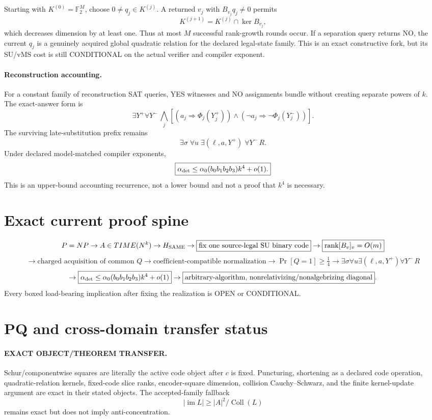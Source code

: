 \documentclass[11pt]{article}
\begin{document}
Starting with \(K^{(0)}=\mathbb F_2^M\), choose \(0\ne q_j\in K^{(j)}\). A returned \(v_j\) with \(B_{v_j}q_j\ne0\) permits
\[
K^{(j+1)}=K^{(j)}\cap\ker B_{v_j},
\]
which decreases dimension by at least one. Thus at most \(M\) successful rank-growth rounds occur. If a separation query returns NO, the current \(q_j\) is a genuinely acquired global quadratic relation for the declared legal-state family. This is an exact constructive fork, but its SU/vMS cost is still CONDITIONAL on the actual verifier and compiler exponent.

\paragraph{Reconstruction accounting.}
For a constant family of reconstruction SAT queries, YES witnesses and NO assignments bundle without creating separate powers of \(k\). The exact-answer form is
\[
\exists Y^+\forall Y^-\,\bigwedge_j
[(a_j\Rightarrow\Phi_j(Y_j^+))\wedge
(\neg a_j\Rightarrow\neg\Phi_j(Y_j^-))].
\]
The surviving late-substitution prefix remains
\[
\boxed{\exists\sigma\;\forall u\;\exists(\ell,a,Y^+)\;\forall Y^-\,R.}
\]
Under declared model-matched compiler exponents,
\[
\boxed{\alpha_{\rm det}\le
\alpha_0(b_0b_1b_2b_3)k^4+o(1).}
\]
This is an upper-bound accounting recurrence, not a lower bound and not a proof that \(k^4\) is necessary.

\section*{Exact current proof spine}
\[
P=NP
\to A\in TIME(N^k)
\to H_{\rm SAME}
\to\boxed{\text{fix one source-legal SU binary code}}
\to\boxed{\operatorname{rank}[B_v]_v=O(m)}
\]
\[
\to\boxed{\text{charged acquisition of common }Q}
\to\boxed{\text{coefficient-compatible normalization}}
\to\Pr[Q=1]\ge\tfrac14
\to\boxed{\exists\sigma\forall u\exists(\ell,a,Y^+)\forall Y^-\,R}
\]
\[
\to\boxed{\alpha_{\rm det}\le
\alpha_0(b_0b_1b_2b_3)k^4+o(1)}
\to\boxed{\text{arbitrary-algorithm, nonrelativizing/nonalgebrizing diagonal}}.
\]
Every boxed load-bearing implication after fixing the realization is OPEN or CONDITIONAL.

\section*{PQ and cross-domain transfer status}
\paragraph{EXACT OBJECT/THEOREM TRANSFER.}
Schur/componentwise squares are literally the active code object after \(c\) is fixed. Puncturing, shortening as a declared code operation, quadratic-relation kernels, fixed-code slice ranks, encoder-square dimension, collision Cauchy--Schwarz, and the finite kernel-update argument are exact in their stated objects. The accepted-family fallback
\[
|\operatorname{im}L|\ge |A|^2/\operatorname{Coll}(L)
\]
remains exact but does not imply anti-concentration.
\end{document}

